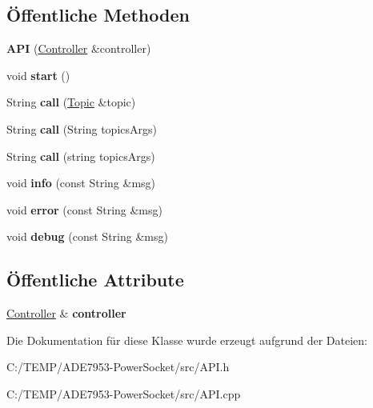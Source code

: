 \subsection*{Öffentliche Methoden}
\begin{DoxyCompactItemize}
\item 
\mbox{\label{class_a_p_i_a27a09222e98a84f49cf49e5c085fbe3d}} 
{\bfseries A\+PI} (\hyperlink{class_controller}{Controller} \&controller)
\item 
\mbox{\label{class_a_p_i_a2153db9ccf3b54c5fa9b885492a3b0e0}} 
void {\bfseries start} ()
\item 
\mbox{\label{class_a_p_i_afebdcc5458f58678900420e2be8990c6}} 
String {\bfseries call} (\hyperlink{class_topic}{Topic} \&topic)
\item 
\mbox{\label{class_a_p_i_a39ff2d68c232fd788fd16284b653eef5}} 
String {\bfseries call} (String topics\+Args)
\item 
\mbox{\label{class_a_p_i_a9fdc8dacbf201cfc8f7f9f2ecee8da59}} 
String {\bfseries call} (string topics\+Args)
\item 
\mbox{\label{class_a_p_i_aa53d4a4d6c09911634e8a82562a8f8a7}} 
void {\bfseries info} (const String \&msg)
\item 
\mbox{\label{class_a_p_i_ab8497c19f62a12e9f4f7ea7e2308fe8f}} 
void {\bfseries error} (const String \&msg)
\item 
\mbox{\label{class_a_p_i_a1f500c0f1d811e0f510f706e2cfd85c6}} 
void {\bfseries debug} (const String \&msg)
\end{DoxyCompactItemize}
\subsection*{Öffentliche Attribute}
\begin{DoxyCompactItemize}
\item 
\mbox{\label{class_a_p_i_a940cddbb9d7df3506211ebe47f267cb3}} 
\hyperlink{class_controller}{Controller} \& {\bfseries controller}
\end{DoxyCompactItemize}


Die Dokumentation für diese Klasse wurde erzeugt aufgrund der Dateien\+:\begin{DoxyCompactItemize}
\item 
C\+:/\+T\+E\+M\+P/\+A\+D\+E7953-\/\+Power\+Socket/src/A\+P\+I.\+h\item 
C\+:/\+T\+E\+M\+P/\+A\+D\+E7953-\/\+Power\+Socket/src/A\+P\+I.\+cpp\end{DoxyCompactItemize}
